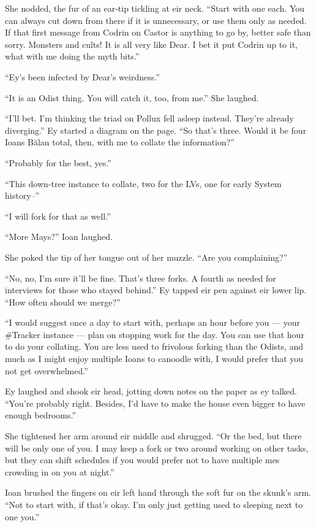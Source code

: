 She nodded, the fur of an ear-tip tickling at eir neck. ``Start with one each. You can always cut down from there if it is unnecessary, or use them only as needed. If that first message from Codrin on Castor is anything to go by, better safe than sorry. Monsters and cults! It is all very like Dear. I bet it put Codrin up to it, what with me doing the myth bits.''

``Ey's been infected by Dear's weirdness.''

``It is an Odist thing. You will catch it, too, from me.'' She laughed.

``I'll bet. I'm thinking the triad on Pollux fell asleep instead. They're already diverging.'' Ey started a diagram on the page. ``So that's three. Would it be four Ioans Bălan total, then, with me to collate the information?''

``Probably for the best, yes.''

``This down-tree instance to collate, two for the LVs, one for early System history--''

``I will fork for that as well.''

``More Mays?'' Ioan laughed.

She poked the tip of her tongue out of her muzzle. ``Are you complaining?''

``No, no, I'm sure it'll be fine. That's three forks. A fourth as needed for interviews for those who stayed behind.'' Ey tapped eir pen against eir lower lip. ``How often should we merge?''

``I would suggest once a day to start with, perhaps an hour before you — your \#Tracker instance — plan on stopping work for the day. You can use that hour to do your collating. You are less used to frivolous forking than the Odists, and much as I might enjoy multiple Ioans to canoodle with, I would prefer that you not get overwhelmed.''

Ey laughed and shook eir head, jotting down notes on the paper as ey talked. ``You're probably right. Besides, I'd have to make the house even bigger to have enough bedrooms.''

She tightened her arm around eir middle and shrugged. ``Or the bed, but there will be only one of you. I may keep a fork or two around working on other tasks, but they can shift schedules if you would prefer not to have multiple mes crowding in on you at night.''

Ioan brushed the fingers on eir left hand through the soft fur on the skunk's arm. ``Not to start with, if that's okay. I'm only just getting used to sleeping next to one you.''

